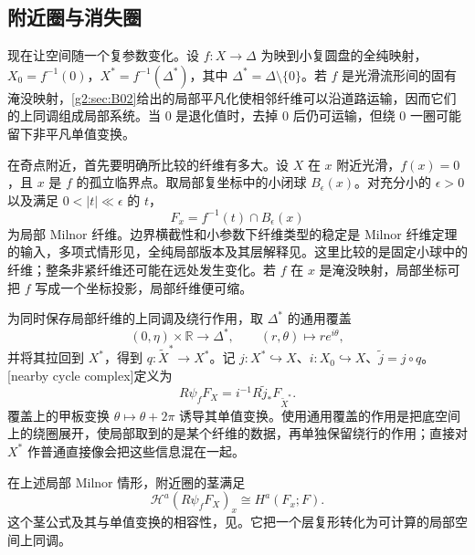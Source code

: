 \subsection{附近圈与消失圈}
\label{g2:subsec:B04:03}

现在让空间随一个复参数变化。设 \(f:X\to\Delta\) 为映到小复圆盘的全纯映射，\(X_0=f^{-1}(0)\)，\(X^*=f^{-1}(\Delta^*)\)，其中 \(\Delta^*=\Delta\setminus\{0\}\)。若 \(f\) 是光滑流形间的固有淹没映射，\cref{g2:sec:B02}给出的局部平凡化使相邻纤维可以沿道路运输，因而它们的上同调组成局部系统。当 \(0\) 是退化值时，去掉 \(0\) 后仍可运输，但绕 \(0\) 一圈可能留下非平凡单值变换。

\ProseParagraphBreak

在奇点附近，首先要明确所比较的纤维有多大。设 \(X\) 在 \(x\) 附近光滑，\(f(x)=0\)，且 \(x\) 是 \(f\) 的孤立临界点。取局部复坐标中的小闭球 \(B_\epsilon(x)\)。对充分小的 \(\epsilon>0\) 以及满足 \(0<|t|\ll\epsilon\) 的 \(t\)，
\[
	F_x=f^{-1}(t)\cap B_\epsilon(x)
\]
为局部 Milnor 纤维。边界横截性和小参数下纤维类型的稳定是 Milnor 纤维定理的输入，多项式情形见\cite[第4—6节]{Milnor1968SingularPoints}，全纯局部版本及其层解释见\cite[第4.2节]{Dimca2004Sheaves}。这里比较的是固定小球中的纤维；整条非紧纤维还可能在远处发生变化。若 \(f\) 在 \(x\) 是淹没映射，局部坐标可把 \(f\) 写成一个坐标投影，局部纤维便可缩。

\ProseParagraphBreak

为同时保存局部纤维的上同调及绕行作用，取 \(\Delta^*\) 的通用覆盖
\[
	(0,\eta)\times\mathbb R\longrightarrow\Delta^*,\qquad
	(r,\theta)\longmapsto re^{i\theta},
\]
并将其拉回到 \(X^*\)，得到 \(q:\widetilde X^*\to X^*\)。记 \(j:X^*\hookrightarrow X\)、\(i:X_0\hookrightarrow X\)、\(\widetilde j=j\circ q\)。[nearby cycle complex]定义为
\begin{equation}\label{g2:eq:nearby-cycle-complex}
	R\psi_fF_X=i^{-1}R\widetilde j_*F_{\widetilde X^*}.
\end{equation}
覆盖上的甲板变换 \(\theta\mapsto\theta+2\pi\) 诱导其单值变换。使用通用覆盖的作用是把底空间上的绕圈展开，使局部取到的是某个纤维的数据，再单独保留绕行的作用；直接对 \(X^*\) 作普通直接像会把这些信息混在一起。

\ProseParagraphBreak

在上述局部 Milnor 情形，附近圈的茎满足
\begin{equation}\label{g2:eq:nearby-stalk-milnor}
	\mathcal H^a(R\psi_fF_X)_x\cong H^a(F_x;F).
\end{equation}
这个茎公式及其与单值变换的相容性，见\cite[定义4.2.1、命题4.2.2]{Dimca2004Sheaves}。它把一个层复形转化为可计算的局部空间上同调。

